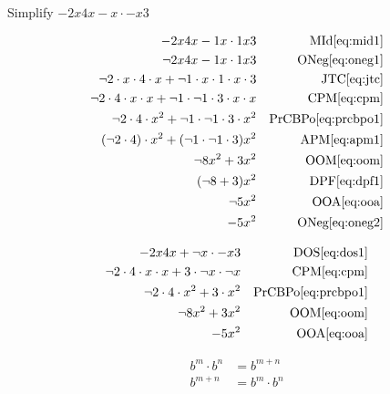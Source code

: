 \documentclass[20150903-160354-rs2.2-MarksMathNotebook.tex]{subfiles}
\begin{document}
\begin{example}[id:20141108-194709] \label{20141108-194709}  \hfill \\

Simplify $- 2x4x - x \cdot-x3$

\soln

\solnsteps
\begin{align*}
-2x4x-1x \cdot 1x3 && \text{MId} \eqref{eq:mid1} \\
\neg 2x4x-1x \cdot 1x3  && \text{ONeg} \eqref{eq:oneg1} \\
\neg 2 \cdot x \cdot 4 \cdot x + \neg 1 \cdot x \cdot 1 \cdot x \cdot 3 && \text{JTC} \eqref{eq:jtc} \\
\neg 2 \cdot 4 \cdot x \cdot x + \neg 1 \cdot \neg 1 \cdot 3 \cdot x \cdot x && \text{CPM} \eqref{eq:cpm} \\
\neg 2 \cdot 4 \cdot x^2  + \neg 1 \cdot \neg 1 \cdot 3 \cdot x^2 && \text{PrCBPo} \eqref{eq:prcbpo1} \\
(\neg 2 \cdot 4) \cdot x^2 + (\neg 1 \cdot \neg 1 \cdot 3) x^2 && \text{APM} \eqref{eq:apm1} \\
\neg 8 x^2 + 3 x^2 && \text{OOM} \eqref{eq:oom} \\
(\neg 8 + 3)x^2 && \text{DPF} \eqref{eq:dpf1} \\
\neg 5 x^2 && \text{OOA} \eqref{eq:ooa} \\
-5x^2 && \text{ONeg} \eqref{eq:oneg2}
\end{align*}

\soln

\lesssteps
\begin{align*}
- 2x4x + \neg x \cdot-x3  && \text{DOS} \eqref{eq:dos1} \\
\neg 2 \cdot 4 \cdot x \cdot x + 3 \cdot \neg x \cdot \neg x && \text{CPM} \eqref{eq:cpm} \\
\neg 2 \cdot 4 \cdot x^2 + 3 \cdot x^2 && \text{PrCBPo} \eqref{eq:prcbpo1} \\
\neg 8x^2 + 3 x^2 && \text{OOM} \eqref{eq:oom} \\
-5x^2 && \text{OOA} \eqref{eq:ooa}
\end{align*}

\end{example}

\begin{arule}
\begin{subequations}
\begin{align}
	b^m \cdot b^n &= b^{m+n} \label{eq:prcbpo1}\\
	b^{m+n} &= b^m \cdot b^n \label{eq:prcbpo2}
\end{align}
\end{subequations}
\end{arule}
\end{document}

